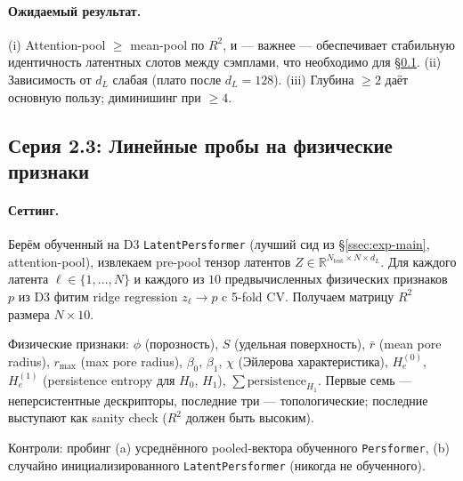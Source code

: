 \paragraph{Ожидаемый результат.} (i) Attention-pool $\geq$ mean-pool по $R^2$, и --- важнее --- обеспечивает стабильную идентичность латентных слотов между сэмплами, что необходимо для §\ref{ssec:exp-probes}. (ii) Зависимость от $d_L$ слабая (плато после $d_L=128$). (iii) Глубина $\geq 2$ даёт основную пользу; диминишинг при $\geq 4$.

\begin{table}[ht]
\centering
{}
\caption{Архитектурные ablation'ы на D1.}
\label{tab:arch-ablation}
\end{table}

\subsection{Серия 2.3: Линейные пробы на физические признаки}
\label{ssec:exp-probes}

\paragraph{Сеттинг.} Берём обученный на D3 \texttt{LatentPersformer} (лучший сид из §\ref{ssec:exp-main}, attention-pool), извлекаем pre-pool тензор латентов $Z \in \mathbb{R}^{N_\text{test} \times N \times d_L}$. Для каждого латента $\ell \in \{1, \dots, N\}$ и каждого из $10$ предвычисленных физических признаков $p$ из D3 фитим ridge regression $z_\ell \to p$ c 5-fold CV. Получаем матрицу $R^2$ размера $N \times 10$.

Физические признаки: $\phi$ (порозность), $S$ (удельная поверхность), $\bar r$ (mean pore radius), $r_{\max}$ (max pore radius), $\beta_0$, $\beta_1$, $\chi$ (Эйлерова характеристика), $H_e^{(0)}$, $H_e^{(1)}$ (persistence entropy для $H_0$, $H_1$), $\sum \text{persistence}_{H_1}$. Первые семь --- неперсистентные дескрипторы, последние три --- топологические; последние выступают как sanity check ($R^2$ должен быть высоким).

Контроли: пробинг (a) усреднённого pooled-вектора обученного \texttt{Persformer}, (b) случайно инициализированного \texttt{LatentPersformer} (никогда не обученного).

